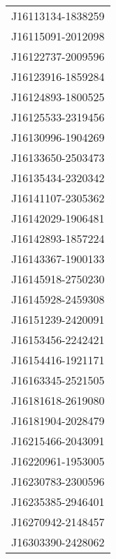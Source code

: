 \begin{longtable}{l}
J16113134-1838259 \\
J16115091-2012098 \\
J16122737-2009596 \\
J16123916-1859284 \\
J16124893-1800525 \\
J16125533-2319456 \\
J16130996-1904269 \\
J16133650-2503473 \\
J16135434-2320342 \\
J16141107-2305362 \\
J16142029-1906481 \\
J16142893-1857224 \\
J16143367-1900133 \\
J16145918-2750230 \\
J16145928-2459308 \\
J16151239-2420091 \\
J16153456-2242421 \\
J16154416-1921171 \\
J16163345-2521505 \\
J16181618-2619080 \\
J16181904-2028479 \\
J16215466-2043091 \\
J16220961-1953005 \\
J16230783-2300596 \\
J16235385-2946401 \\
J16270942-2148457 \\
J16303390-2428062 \\
\end{longtable}
